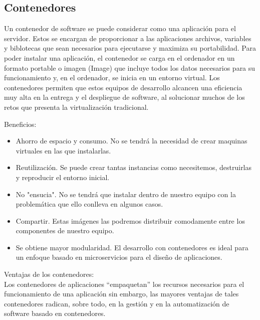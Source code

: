 \documentclass[%
 reprint,
 amsmath,amssymb,
 aps,
]{revtex4-1}
\begin{document}
\subsection{Contenedores}
\par Un contenedor de software se puede considerar como una aplicación para el servidor. Estos se encargan de proporcionar a las aplicaciones archivos, variables y biblotecas que sean necesarios para ejecutarse y maximiza su portabilidad.
Para poder instalar una aplicación, el contenedor se carga en el ordenador en un formato portable o imagen (Image) que incluye todos los datos necesarios para su funcionamiento y, en el ordenador, se inicia en un entorno virtual. \cite{know}
Los contenedores permiten que estos equipos de desarrollo alcancen una eficiencia muy alta en la entrega y el despliegue de software, al solucionar muchos de los retos que presenta la virtualización tradicional.
\par Beneficios:
	\begin{itemize}
		\item Ahorro de espacio y consumo. No se tendrá la necesidad de crear maquinas virtuales en las que instalarlas.
		\item Reutilización. Se puede crear tantas instancias como necesitemos, destruirlas y reproducir el entorno inicial.
		\item No "ensucia". No se tendrá que instalar dentro de nuestro equipo con la problemática que ello conlleva en algunos casos.
		\item Compartir. Estas imágenes las podremos distribuir comodamente entre los componentes de nuestro equipo.
		\item Se obtiene mayor modularidad. El desarrollo con contenedores es ideal para un enfoque basado en microservicios para el diseño de aplicaciones.\cite{campus}
	\end{itemize}
\par Ventajas de los contenedores: \\
Los contenedores de aplicaciones “empaquetan” los recursos necesarios para el funcionamiento de una aplicación sin embargo, las mayores ventajas de tales contenedores radican, sobre todo, en la gestión y en la automatización de software basado en contenedores.\cite{know}
\end{document}
